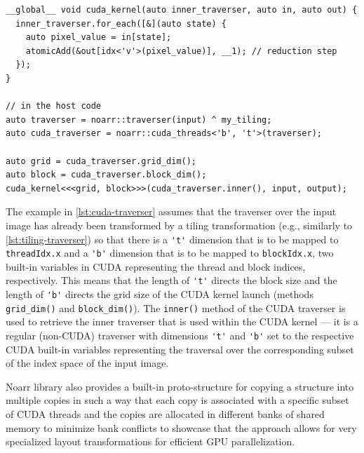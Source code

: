 \begin{lstlisting}[style=C++, caption={Binding a Noarr traverser to CUDA grid and block dimensions}, label=lst:cuda-traverser,basicstyle=\ttfamily\scriptsize]
__global__ void cuda_kernel(auto inner_traverser, auto in, auto out) {
  inner_traverser.for_each([&](auto state) {
    auto pixel_value = in[state];
    atomicAdd(&out[idx<'v'>(pixel_value)], __1); // reduction step
  });
}

// in the host code
auto traverser = noarr::traverser(input) ^ my_tiling;
auto cuda_traverser = noarr::cuda_threads<'b', 't'>(traverser);

auto grid = cuda_traverser.grid_dim();
auto block = cuda_traverser.block_dim();
cuda_kernel<<<grid, block>>>(cuda_traverser.inner(), input, output);
\end{lstlisting}

The example in \cref{lst:cuda-traverser} assumes that the traverser over the input image has already been transformed by a tiling transformation (e.g., similarly to \cref{lst:tiling-traverser}) so that there is a \lstinline{'t'} dimension that is to be mapped to \texttt{threadIdx.x} and a \lstinline{'b'} dimension that is to be mapped to \texttt{blockIdx.x}, two built-in variables in CUDA representing the thread and block indices, respectively. This means that the length of \lstinline{'t'} directs the block size and the length of \lstinline{'b'} directs the grid size of the CUDA kernel launch (methods \lstinline{grid_dim()} and \lstinline{block_dim()}). The \lstinline{inner()} method of the CUDA traverser is used to retrieve the inner traverser that is used within the CUDA kernel --- it is a regular (non-CUDA) traverser with dimensions \lstinline{'t'} and \lstinline{'b'} set to the respective CUDA built-in variables representing the traversal over the corresponding subset of the index space of the input image.

Noarr library also provides a built-in proto-structure for copying a structure into multiple copies in such a way that each copy is associated with a specific subset of CUDA threads and the copies are allocated in different banks of shared memory to minimize bank conflicts to showcase that the approach allows for very specialized layout transformations for efficient GPU parallelization.



